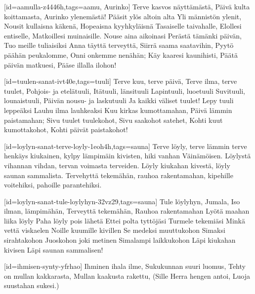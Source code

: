 [id={aamulla-z4446h},tags={aamu, Aurinko}]
  \beginverse
    Terve kasvos näyttämästä,
    Päivä kulta koittamasta,
    Aurinko ylenemästä!
    Pääsit ylös altoin alta
    Yli männistön ylenit,
    Nousit kullaisna käkenä,
    Hopeaisna kyyhkyläisnä
    Tasaiselle taivahalle,
    Elollesi entiselle,
    Matkoillesi muinaisille.
  \endverse
  \beginverse
    Nouse aina aikoinasi
    Perästä tämänki päivän,
    Tuo meille tuliaisiksi
    Anna täyttä terveyttä,
    Siirrä saama saatavihin,
    Pyytö päähän peukalomme,
    Onni onkemme nenähän;
    Käy kaaresi kaunihisti,
    Päätä päivän matkuesi,
    Pääse illalla ilohon!
  \endverse
\endsong


[id={tuulen-sanat-ivt40e},tags={tuuli}]
  \beginverse
    Terve kuu, terve päivä,
    Terve ilma, terve tuulet,
    Pohjois- ja etelätuuli,
    Itätuuli, länsituuli
    Lapintuuli, luoetuuli
    Suvituuli, lounaistuuli,
    Päivän nousu- ja laskutuuli
    Ja kaikki väliset tuulet!
    Lepy tuuli leppeäksi
    Lauhu ilma lauhkeaksi
    Kuu kirkas kumottamahan,
    Päivä lämmin paistamahan;
    Sivu tuulet tuulekohot,
    Sivu saakohot satehet,
    Kohti kuut kumottakohot,
    Kohti päivät paistakohot!
  \endverse
\endsong


[id={loylyn-sanat-terve-loyly-1eoh4h},tags={sauna}]
  \beginverse
    Terve löyly, terve lämmin
    terve henkäys kiukainen,
    kylpy lämpimäin kivisten,
    hiki vanhan Väinämöisen.
    Löylystä vihannan vihdan,
    tervan voimasta terveiden.
  \endverse
  \beginverse
    Löyly kiukahan kivestä,
    löyly saunan sammalista.
    Tervehyttä tekemähän,
    rauhoa rakentamahan,
    kipehille voitehiksi,
    pahoille parantehiksi.
  \endverse
\endsong


[id={loylyn-sanat-tule-loylyhyn-32vz29},tags={sauna}]
  \beginverse
    Tule löylyhyn, Jumala,
    Iso ilman, lämpimähän,
    Terveyttä tekemähän,
    Rauhoa rakentamahan
  \endverse
  \beginverse
    Lyötä maahan liika löyly
    Paha löyly pois lähetä
    Ettei polta tyttöjäsi
    Turmele tekemiäsi
  \endverse
  \beginverse
    Minkä vettä viskaelen
    Noille kuumille kivillen
    Se medeksi muuttukohon
    Simaksi sirahtakohon
  \endverse
  \beginverse
    Juoskohon joki metinen
    Simalampi laikkukohon
    Läpi kiukahan kivisen
    Läpi saunan sammalisen!
  \endverse
\endsong


[id={ihmisen-synty-yfrhao}]
  \beginverse
    Ihminen ihala ilme,
    Sukukunnan suuri luomus,
    Tehty on mullan kakkarasta,
    Mullan kaakusta rakettu,
    (Sille Herra hengen antoi,
    Luoja suustahan sukesi.)
  \endverse
\endsong


